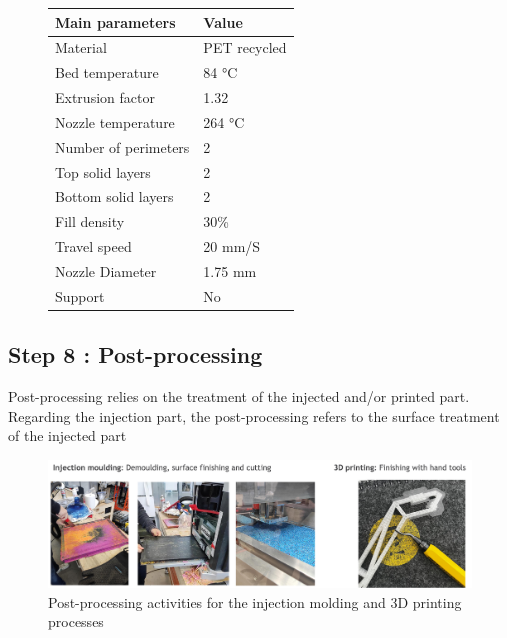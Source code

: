 \documentclass[
  11pt,
]{article}
\begin{document}
\begin{figure}
\begin{minipage}[t]{0.55\linewidth}
{\centering 

\begin{longtable}[]{@{}ll@{}}
\toprule\noalign{}
Main parameters & Value \\
\midrule\noalign{}
\endhead
\bottomrule\noalign{}
\endlastfoot
Material & PET recycled \\
Bed temperature & 84 °C \\
Extrusion factor & 1.32 \\
Nozzle temperature & 264 °C \\
Number of perimeters & 2 \\
Top solid layers & 2 \\
Bottom solid layers & 2 \\
Fill density & 30\% \\
Travel speed & 20 mm/S \\
Nozzle Diameter & 1.75 mm \\
Support & No \\
\end{longtable}

}

\end{minipage}%

\end{figure}

\hypertarget{step-8-post-processing}{%
\subsection{Step 8 : Post-processing}\label{step-8-post-processing}}

Post-processing relies on the treatment of the injected and/or printed
part. Regarding the injection part, the post-processing refers to the
surface treatment of the injected part

\begin{figure}[H]

{\centering \includegraphics{figures/post-processing.jpg}

}

\caption{Post-processing activities for the injection molding and 3D
printing processes}

\end{figure}
\end{document}
